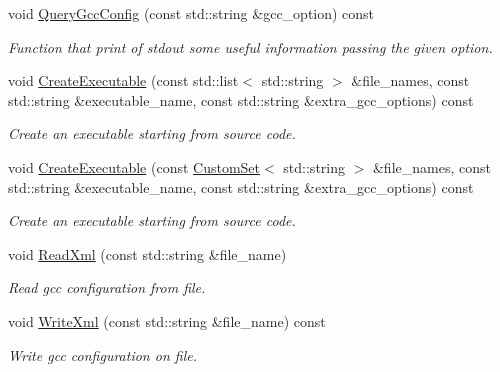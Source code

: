 \begin{DoxyCompactItemize}
void \hyperlink{classGccWrapper_a6ddadf157967ed22e87a5453f3bb25db}{Query\+Gcc\+Config} (const std\+::string \&gcc\+\_\+option) const
\begin{DoxyCompactList}\small\item\em Function that print of stdout some useful information passing the given option. \end{DoxyCompactList}\item 
void \hyperlink{classGccWrapper_ac2cc3fad0dd5560c7dc07e56bf19ec02}{Create\+Executable} (const std\+::list$<$ std\+::string $>$ \&file\+\_\+names, const std\+::string \&executable\+\_\+name, const std\+::string \&extra\+\_\+gcc\+\_\+options) const
\begin{DoxyCompactList}\small\item\em Create an executable starting from source code. \end{DoxyCompactList}\item 
void \hyperlink{classGccWrapper_a22e1843178f153216c1f7775e00938d7}{Create\+Executable} (const \hyperlink{custom__set_8hpp_a615bc2f42fc38a4bb1790d12c759e86f}{Custom\+Set}$<$ std\+::string $>$ \&file\+\_\+names, const std\+::string \&executable\+\_\+name, const std\+::string \&extra\+\_\+gcc\+\_\+options) const
\begin{DoxyCompactList}\small\item\em Create an executable starting from source code. \end{DoxyCompactList}\item 
void \hyperlink{classGccWrapper_a89445158bf3052bd6dfaca4372016516}{Read\+Xml} (const std\+::string \&file\+\_\+name)
\begin{DoxyCompactList}\small\item\em Read gcc configuration from file. \end{DoxyCompactList}\item 
void \hyperlink{classGccWrapper_a34ebfe793ec69e13bea2d0996d3c9bcd}{Write\+Xml} (const std\+::string \&file\+\_\+name) const
\begin{DoxyCompactList}\small\item\em Write gcc configuration on file. \end{DoxyCompactList}\end{DoxyCompactItemize}
